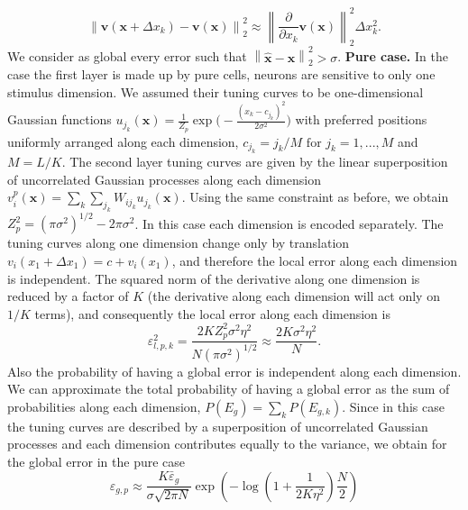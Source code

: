 \documentclass[a4paper]{article}%
\begin{document}
\begin{equation}
\left\|  \mathbf{v}(\mathbf{x} + \Delta x_{k}) - \mathbf{v}(\mathbf{x}
)\right\| _{2}^{2} \approx\left\|  \frac{\partial}{\partial x_{k}}
\mathbf{v}(\mathbf{x})\right\| _{2}^{2} \Delta x_{k}^{2}.
\end{equation}
We consider as global every error such that $\left\|
\hat{\mathbf{x}}-\mathbf{x}\right\| _{2}^{2} > \sigma$. \newline
\newline\textbf{Pure case.} In the case the first layer is made up by pure
cells, neurons are sensitive to only one stimulus dimension. We assumed their
tuning curves to be one-dimensional Gaussian functions \newline
$u_{j_{k}}(\mathbf{x}) =
\frac{1}{Z_{p}} \exp\Big(-\frac{(x_{k} - c_{j_{k}})^{2}}{2\sigma^{2}}\Big)$
with preferred positions uniformly arranged along each dimension, $c_{j_{k}} =
j_{k}/M \text{ for } j_{k}=1,...,M $ and $M=L/K$. The second layer
tuning curves are given by the linear superposition of uncorrelated Gaussian
processes along each dimension $v_{i}^{p}(\mathbf{x}) = \sum_{k} \sum_{j_{k}}W_{ij_{k}} u_{j_{k}}(\mathbf{x}).$ Using the same constraint as before, we
obtain $Z_{p}^{2} = (\pi\sigma^{2})^{1/2} - 2\pi\sigma^{2}$. In this case each
dimension is encoded separately. The tuning curves along one dimension change
only by translation $v_{i}(x_{1} + \Delta x_{1}) = c + v_{i}(x_{1})$, and
therefore the local error along each dimension is independent. The squared
norm of the derivative along one dimension is reduced by a factor of $K$ (the
derivative along each dimension will act only on $1/K$ terms), and
consequently the local error along each dimension is
\begin{equation}
\varepsilon^2_{l,p,k} = \frac{2 K Z_{p}^{2} \sigma^{2}
\eta^{2}}{N (\pi\sigma^{2})^{1/2}} \approx\frac{2 K \sigma^{2} \eta^{2}}{N}.
\end{equation}
Also the probability of having a global error is independent along each
dimension. We can approximate the total probability of having a global error
as the sum of probabilities along each dimension, $P(E_{g}) =
\sum_{k} P(E_{g,k})$. Since in this case the tuning curves are described
by a superposition of uncorrelated Gaussian processes and each dimension
contributes equally to the variance, we obtain for the global error in the
pure case
\begin{equation}
\varepsilon_{g,p}  \approx\frac{K\bar{\varepsilon}_{g}
}{\sigma\sqrt{2\pi N}} \exp{\left(-\log\left(1 + \frac{1}
{2 K \eta^{2}}\right)\frac{N}{2} \right)}
\label{Eq:multi-global-pure}
\end{equation}
\end{document}

